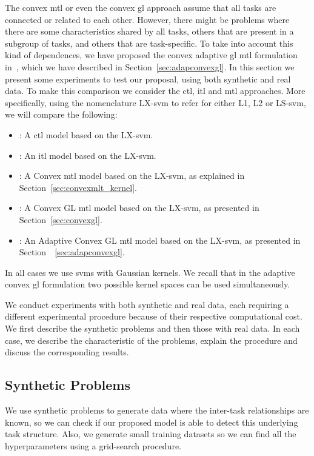 The convex \acrshort{mtl} or even the convex \acrshort{gl} approach assume that all tasks are connected or related to each other. However, there might be problems where there are some characteristics shared by all tasks, others that are present in a subgroup of tasks, and others that are task-specific.
%
To take into account this kind of dependences, we have proposed the convex adaptive \acrshort{gl} \acrshort{mtl} formulation in~\cite{RuizAD21_hais}, which we have described in Section~\ref{sec:adapconvexgl}.
%
In this section we present some experiments to test our proposal, using both synthetic and real data. 
%
To make this comparison we consider the \acrshort{ctl}, \acrshort{itl} and \acrshort{mtl} approaches. More specifically, using the nomenclature LX-\acrshort{svm} to refer for either L1, L2 or LS-\acrshort{svm}, we will compare the following:
\begin{itemize}
    \item {}: A \acrshort{ctl} model based on the LX-\acrshort{svm}.
    \item {}: An \acrshort{itl} model based on the LX-\acrshort{svm}.
    \item {}: A Convex \acrshort{mtl} model based on the LX-\acrshort{svm}, as explained in Section~\ref{sec:convexmlt_kernel}.
    \item {}: A Convex GL \acrshort{mtl} model based on the LX-\acrshort{svm}, as presented in Section~\ref{sec:convexgl}.
    \item {}: An Adaptive Convex GL \acrshort{mtl} model based on the LX-\acrshort{svm}, as presented in Section~~\ref{sec:adapconvexgl}.
\end{itemize}
In all cases we use \acrshort{svms} with Gaussian kernels. We recall that in the adaptive convex \acrshort{gl} formulation two possible kernel spaces can be used simultaneously.
%

We conduct experiments with both synthetic and real data, each requiring a different experimental procedure because of their respective computational cost. We first describe the synthetic problems and then those with real data. In each case, we describe the characteristic of the problems, explain the procedure and discuss the corresponding results. 



\subsection{Synthetic Problems}
%
We use synthetic problems to generate data where the inter-task relationships are known, so we can check if our proposed model is able to detect this underlying task structure.
%
Also, we generate small training datasets so we can find all the hyperparameters using a grid-search procedure.

